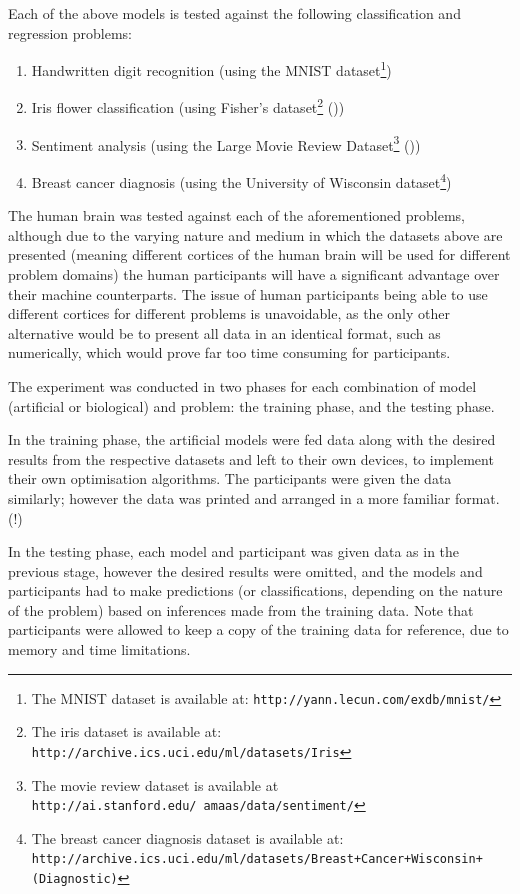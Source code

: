 \documentclass[]{report}
\begin{document}
Each of the above models is tested against the following classification and regression problems:

\begin{enumerate}
	\item Handwritten digit recognition (using the MNIST dataset\footnote{The MNIST dataset is available at: \texttt{http://yann.lecun.com/exdb/mnist/}})
	\item Iris flower classification (using Fisher's dataset\footnote{The iris dataset is available at: \texttt{http://archive.ics.uci.edu/ml/datasets/Iris}} (\cite{uciml2007}))
	\item Sentiment analysis (using the Large Movie Review Dataset\footnote{The movie review dataset is available at \texttt{http://ai.stanford.edu/~amaas/data/sentiment/}} (\cite{maas2011imdb}))
	\item Breast cancer diagnosis (using the University of Wisconsin dataset\footnote{The breast cancer diagnosis dataset is available at: \texttt{http://archive.ics.uci.edu/ml/datasets/Breast+Cancer+Wisconsin+(Diagnostic)}})
\end{enumerate}

The human brain was tested against each of the aforementioned problems, although due to the varying nature and medium in which the datasets above are presented (meaning different cortices of the human brain will be used for different problem domains) the human participants will have a significant advantage over their machine counterparts. The issue of human participants being able to use different cortices for different problems is unavoidable, as the only other alternative would be to present all data in an identical format, such as numerically, which would prove far too time consuming for participants.

The experiment was conducted in two phases for each combination of model (artificial or biological) and problem: the training phase, and the testing phase.

In the training phase, the artificial models were fed data along with the desired results from the respective datasets and left to their own devices, to implement their own optimisation algorithms. The participants were given the data similarly; however the data was printed and arranged in a more familiar format. (!)

In the testing phase, each model and participant was given data as in the previous stage, however the desired results were omitted, and the models and participants had to make predictions (or classifications, depending on the nature of the problem) based on inferences made from the training data. Note that participants were allowed to keep a copy of the training data for reference, due to memory and time limitations.
\end{document}
